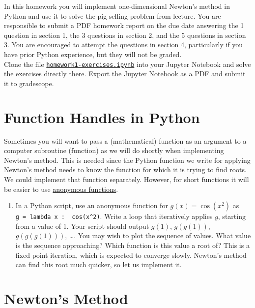 \documentclass[letter]{article}
\newcommand{\setheader}[6]{
	\lhead{{\sc #1}\\{\sc #2}}%
	\rhead{
		{\bf #3} 
		\ifthenelse{\equal{#4}{}}{}{(#4)}\\
		{\bf #5} 
		\ifthenelse{\equal{#6}{}}{}{(#6)}%
	}
}
\begin{document}
	\setheader{APM348}{Homework 1}{Due: 5:59pm January 26}{}{}{}

In this homework you will implement one-dimensional Newton's method in Python and use it to solve the pig selling problem from lecture. You are responsible to submit a PDF homework report on the due date answering the 1 question in section 1, the 3 questions in section 2, and the 5 questions in section 3. You are encouraged to attempt the questions in section 4, particularly if you have prior Python experience, but they will not be graded. \\

Clone the file \href{https://utoronto.syzygy.ca/jupyter/user-redirect/git-pull?repo=https://github.com/bigfatbernie/IBLMathModeling&subPath=homeworks/homework1/homework1-exercises.ipynb}{\tt homework1-exercises.ipynb} into your Jupyter Notebook and solve the exercises directly there.
Export the Jupyter Notebook as a PDF and submit it to gradescope.


\section{Function Handles in Python}

Sometimes you will want to pass a (mathematical) function as an argument to a computer subroutine (function) as we will do shortly when implementing Newton's method. This is needed since the Python function we write for applying Newton's method needs to know the function for which it is trying to find roots. We could implement that function separately. However, for short functions it will be easier to use \href{https://www.w3schools.com/python/python_lambda.asp}{anonymous functions}.

\begin{enumerate}
\item In a Python script, use an anonymous function for $g(x) = \cos(x^2)$ as \\\verb|g = lambda x :  cos(x^2)|. Write a loop that iteratively applies $g$, starting from a value of 1. Your script should output $g(1)$, $g(g(1))$, $g(g(g(1)))$, \ldots . You may wish to plot the sequence of values. What value is the sequence approaching? Which function is this value a root of? This is a fixed point iteration, which is expected to converge slowly. Newton's method can find this root much quicker, so let us implement it.
\end{enumerate}

\section{Newton's Method}
\end{document}
